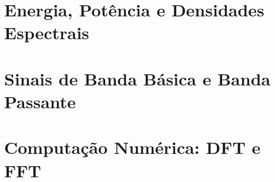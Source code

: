 
% 

\section{Energia, Potência e Densidades Espectrais}



\section{Sinais de Banda Básica e Banda Passante}


\section{Computação Numérica: DFT e FFT}

